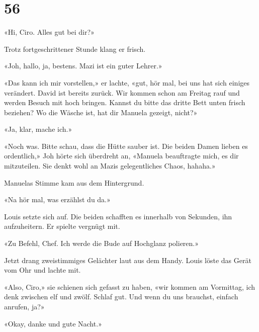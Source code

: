 \chapter{56}



«Hi, Ciro. Alles gut bei dir?»

Trotz fortgeschrittener Stunde klang er frisch.

«Joh, hallo, ja, bestens. Mazi ist ein guter Lehrer.»

«Das kann ich mir vorstellen,» er lachte, «gut, hör mal, bei uns hat sich einiges verändert. David ist bereits zurück. Wir kommen schon am Freitag rauf und werden Besuch mit hoch bringen. Kannst du
bitte das dritte Bett unten frisch beziehen? Wo die
Wäsche ist, hat dir Manuela gezeigt, nicht?»

«Ja, klar, mache ich.»

«Noch was. Bitte schau, dass die Hütte sauber ist. Die beiden Damen
lieben es ordentlich,» Joh hörte sich überdreht an, «Manuela beauftragte
mich, es dir mitzuteilen. Sie denkt wohl an Mazis gelegentliches Chaos,
hahaha.»

Manuelas Stimme kam aus dem Hintergrund. 

«Na hör mal, was erzählst du da.»

Louis setzte sich auf. Die beiden schafften es innerhalb von Sekunden,
ihn aufzuheitern. Er spielte vergnügt mit.

«Zu Befehl, Chef. Ich werde die Bude auf Hochglanz polieren.»

Jetzt drang zweistimmiges Gelächter laut aus dem Handy. Louis löste das
Gerät vom Ohr und lachte mit.

«Also, Ciro,» sie schienen sich gefasst zu haben, «wir kommen am
Vormittag, ich denk zwischen elf und zwölf. Schlaf gut. Und wenn du uns
brauchst, einfach anrufen, ja?»

«Okay, danke und gute Nacht.»

